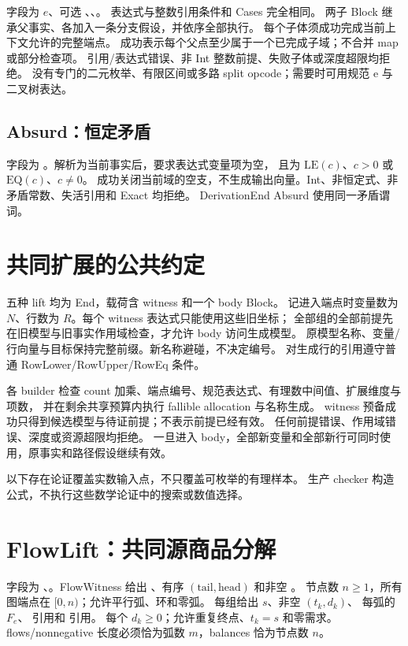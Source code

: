 字段为  $e$、可选 、、。
表达式与整数引用条件和 Cases 完全相同。
两子 Block 继承父事实、各加入一条分支假设，并依序全部执行。
每个子体须成功完成当前上下文允许的完整端点。
成功表示每个父点至少属于一个已完成子域；不合并 map 或部分检查项。
引用/表达式错误、非 Int 整数前提、失败子体或深度超限均拒绝。
没有专门的二元枚举、有限区间或多路 split opcode；需要时可用规范 e 与二叉树表达。

\subsection{Absurd：恒定矛盾}
\label{ins:absurd}
\label{ins:close-false}

字段为 。解析为当前事实后，要求表达式变量项为空，
且为 $\mathrm{LE}(c)$、$c>0$ 或 $\mathrm{EQ}(c)$、$c\ne0$。
成功关闭当前域的空支，不生成输出向量。Int、非恒定式、非矛盾常数、失活引用和 Exact 均拒绝。
DerivationEnd Absurd 使用同一矛盾谓词。

\section{共同扩展的公共约定}
\label{ins:lift-common}

五种 lift 均为 End，载荷含 witness 和一个 body Block。
记进入端点时变量数为 $N$、行数为 $R$。每个 witness 表达式只能使用这些旧坐标；
全部组的全部前提先在旧模型与旧事实作用域检查，才允许 body 访问生成模型。
原模型名称、变量/行向量与目标保持完整前缀。新名称避碰，不决定编号。
对生成行的引用遵守普通 RowLower/RowUpper/RowEq 条件。

各 builder 检查 count 加乘、端点编号、规范表达式、有理数中间值、扩展维度与项数，
并在剩余共享预算内执行 fallible allocation 与名称生成。
witness 预备成功只得到候选模型与待证前提；不表示前提已经有效。
任何前提错误、作用域错误、深度或资源超限均拒绝。
一旦进入 body，全部新变量和全部新行可同时使用，原事实和路径假设继续有效。

以下存在论证覆盖实数输入点，不只覆盖可枚举的有理样本。
生产 checker 构造公式，不执行这些数学论证中的搜索或数值选择。

\section{FlowLift：共同源商品分解}
\label{ins:flow-lift}

字段为 、。FlowWitness 给出 、有序
 $(\mathrm{tail},\mathrm{head})$ 和非空 。
节点数 $n\ge1$，所有图端点在 $[0,n)$；允许平行弧、环和零弧。
每组给出  $s$、非空  $(t_k,d_k)$、
每弧的  $F_e$、 引用和  引用。
每个 $d_k\ge0$；允许重复终点、$t_k=s$ 和零需求。
flows/nonnegative 长度必须恰为弧数 $m$，balances 恰为节点数 $n$。

